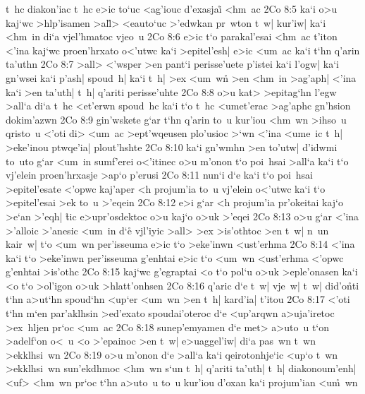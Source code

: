 t~hc
diakon'iac
t~hc
e>ic
to`uc
<ag'iouc
d'exasjai\r{}
<hm~ac\bibvsend
\vs 2Co 8:5
ka`i
o>u
kaj`wc
>hlp'isamen
>al\r{l}>
<eauto`uc
>'edwkan
pr~wton
t~w|
kur'iw|
ka`i
<hm~in
di`a
vjel'hmatoc
vjeo~u\bibvsend
\vs 2Co 8:6
e>ic
t`o
parakal'esai
<hm~ac
t'iton
<'ina
kaj`wc
proen'hrxato
o<'utwc
ka`i
>epitel'esh|
e>ic
<um~ac
ka`i
t`hn
q'arin
ta'uthn\bibvsend
\vs 2Co 8:7
>all>
<'wsper
>en
pant`i
perisse'uete
p'istei
ka`i
l'ogw|
ka`i
gn'wsei
ka`i
p'ash|
spoud~h|
ka`i
t~h|
>ex
<um~wn\r{}
>en
<hm~in
>ag'aph|
<'ina
ka`i
>en
ta'uth|
t~h|
q'ariti
perisse'uhte\bibvsend
\vs 2Co 8:8
o>u
kat>
>epitag`hn
l'egw
>all`a
di`a
t~hc
<et'erwn
spoud~hc
ka`i
t`o
t~hc
<umet'erac
>ag'aphc
gn'hsion
dokim'azwn\bibvsend
\vs 2Co 8:9
gin'wskete
g`ar
t`hn
q'arin
to~u
kur'iou
<hm~wn
>ihso~u
qristo~u
<'oti
di>
<um~ac
>ept'wqeusen
plo'usioc
>`wn
<'ina
<ume~ic
t~h|
>eke'inou
ptwqe'ia|
plout'hshte\bibvsend
\vs 2Co 8:10
ka`i
gn'wmhn
>en
to'utw|
d'idwmi
to~uto
g`ar
<um~in
sumf'erei
o<'itinec
o>u
m'onon
t`o
poi~hsai
>all`a
ka`i
t`o
vj'elein
proen'hrxasje
>ap`o
p'erusi\bibvsend
\vs 2Co 8:11
nun`i
d`e
ka`i
t`o
poi~hsai
>epitel'esate
<'opwc
kaj'aper
<h
projum'ia
to~u
vj'elein
o<'utwc
ka`i
t`o
>epitel'esai
>ek
to~u
>'eqein\bibvsend
\vs 2Co 8:12
e>i
g`ar
<h
projum'ia
pr'okeitai
kaj`o
>e`an
>'eqh|
\r{t}ic
e>upr'osdektoc
o>u
kaj`o
o>uk
>'eqei\bibvsend
\vs 2Co 8:13
o>u
g`ar
<'ina
>'alloic
>'anesic
<um~in
d`e\r{}
vjl'iyic
>all>
>ex
>is'othtoc
>en
t~w|
n~un
kair~w|
t`o
<um~wn
per'isseuma
e>ic
t`o
>eke'inwn
<ust'erhma\bibvsend
\vs 2Co 8:14
<'ina
ka`i
t`o
>eke'inwn
per'isseuma
g'enhtai
e>ic
t`o
<um~wn
<ust'erhma
<'opwc
g'enhtai
>is'othc\bibvsend
\vs 2Co 8:15
kaj`wc
g'egraptai
<o
t`o
pol`u
o>uk
>eple'onasen
ka`i
<o
t`o
>ol'igon
o>uk
>hlatt'onhsen\bibvsend
\vs 2Co 8:16
q'aric
d`e
t~w|
vje~w|
t~w|
did'o\r{n}ti
t`hn
a>ut`hn
spoud`hn
<up`er
<um~wn
>en
t~h|
kard'ia|
t'itou\bibvsend
\vs 2Co 8:17
<'oti
t`hn
m`en
par'aklhsin
>ed'exato
spoudai'oteroc
d`e
<up'arqwn
a>uja'iretoc
>ex~hljen
pr`oc
<um~ac\bibvsend
\vs 2Co 8:18
sunep'emyamen
d`e
met>
a>uto~u
t`on
>adelf`on
o<~u
<o
>'epainoc
>en
t~w|
e>uaggel'iw|
di`a
pas~wn
t~wn
>ekklhsi~wn\bibvsend
\vs 2Co 8:19
o>u
m'onon
d`e
>all`a
ka`i
qeirotonhje`ic
<up`o
t~wn
>ekklhsi~wn
sun'ekdhmoc
<hm~wn
s`un
t~h|
q'ariti
ta'uth|
t~h|
diakonoum'enh|
<uf>
<hm~wn
pr`oc
t`hn
a>uto~u
to~u
kur'iou
d'oxan
ka`i
projum'ian
<u\r{m}~wn\bibvsend
